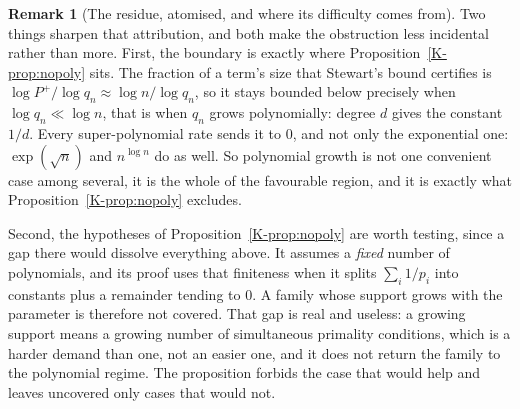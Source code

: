\documentclass[11pt]{article}
\theoremstyle{definition}
\newtheorem{remark}[theorem]{Remark}
\begin{document}
\begin{remark}[The residue, atomised, and where its difficulty comes from]
Two things sharpen that attribution, and both make the obstruction less incidental rather than more.
First, the boundary is exactly where Proposition~\ref{K-prop:nopoly} sits. The fraction of a term's
size that Stewart's bound certifies is $\log P^+/\log q_n\approx\log n/\log q_n$, so it stays bounded
below precisely when $\log q_n\ll\log n$, that is when $q_n$ grows polynomially: degree $d$ gives the
constant $1/d$. Every super-polynomial rate sends it to $0$, and not only the exponential one:
$\exp(\sqrt n)$ and $n^{\log n}$ do as well. So polynomial growth is not one convenient case among
several, it is the whole of the favourable region, and it is exactly what
Proposition~\ref{K-prop:nopoly} excludes.

Second, the hypotheses of Proposition~\ref{K-prop:nopoly} are worth testing, since a gap there would
dissolve everything above. It assumes a \emph{fixed} number of polynomials, and its proof uses that
finiteness when it splits $\sum_i1/p_i$ into constants plus a remainder tending to $0$. A family
whose support grows with the parameter is therefore not covered. That gap is real and useless: a
growing support means a growing number of simultaneous primality conditions, which is a harder
demand than one, not an easier one, and it does not return the family to the polynomial regime. The
proposition forbids the case that would help and leaves uncovered only cases that would not.
\end{remark}
\end{document}
